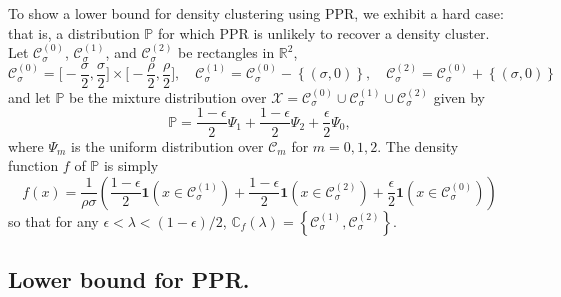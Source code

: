 \documentclass[11pt,twoside]{article}
\newcommand{\set}[1]{\left\{#1\right\}}
\newcommand{\Reals}{\mathbb{R}}
\newcommand{\1}{\mathbf{1}}
\newcommand{\Pbb}{\mathbb{P}}
\begin{document}
To show a lower bound for density clustering using PPR, we exhibit a hard case: that is, a distribution $\Pbb$ for which PPR is unlikely to recover a density cluster. Let $\mathcal{C}_{\sigma}^{(0)}$, $\mathcal{C}_{\sigma}^{(1)}$, and $\mathcal{C}_{\sigma}^{(2)}$ be rectangles in $\Reals^2$, 
\begin{equation*}
\mathcal{C}_{\sigma}^{(0)} = \biggl[-\frac{\sigma}{2}, \frac{\sigma}{2}\biggr] \times \biggl[-\frac{\rho}{2}, \frac{\rho}{2}\biggr], \quad \mathcal{C}_{\sigma}^{(1)} = \mathcal{C}_{\sigma}^{(0)} - \set{(\sigma,0)}, \quad \mathcal{C}_{\sigma}^{(2)} = \mathcal{C}_{\sigma}^{(0)} + \set{(\sigma,0)} \tag{$0 < \sigma < \rho$}
\end{equation*}
and let $\mathbb{P}$ be the mixture distribution over $\mathcal{X} = \mathcal{C}_{\sigma}^{(0)} \cup \mathcal{C}_{\sigma}^{(1)} \cup \mathcal{C}_{\sigma}^{(2)}$ given by
\begin{equation*}
\mathbb{P} = \frac{1 - \epsilon}{2} \Psi_1 + \frac{1 - \epsilon}{2} \Psi_2 + \frac{\epsilon}{2} \Psi_0,
\end{equation*}
where $\Psi_m$ is the uniform distribution over $\mathcal{C}_m$ for $m = 0,1,2$. 
The density function $f$ of $\Pbb$ is simply
\begin{equation}
\label{eqn:lb_density}
f(x) = \frac{1}{\rho\sigma}\left(\frac{1 - \epsilon}{2}\1(x \in \mathcal{C}_{\sigma}^{(1)}) + \frac{1 - \epsilon}{2}\1(x \in \mathcal{C}_{\sigma}^{(2)}) + \frac{\epsilon}{2}\1(x \in \mathcal{C}_{\sigma}^{(0)})  \right)
\end{equation}
so that for any $\epsilon < \lambda < (1 - \epsilon)/2$, $\mathbb{C}_{f}(\lambda) = \set{\mathcal{C}_{\sigma}^{(1)}, \mathcal{C}_{\sigma}^{(2)}}$. 

\subsection{Lower bound for PPR.}
\end{document}
